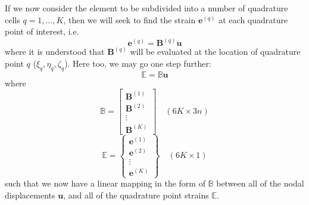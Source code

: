 \documentclass[11pt]{article} %
\begin{document}
If we now consider the element to be subdivided into a number of quadrature cells $q = 1, \ldots, K$, then we will seek to find the strain $\mathbf{e}^{(q)}$ at each quadrature point of interest, i.e.
\begin{equation}
	\mathbf{e}^{(q)} = \mathbf{B}^{(q)} \mathbf{u}
\end{equation}
where it is understood that $\mathbf{B}^{(q)}$ will be evaluated at the location of quadrature point $q$ ($\xi_q, \eta_q, \zeta_q$). Here too, we may go one step further:
\begin{equation}
	\mathbb{E} = \mathbb{B} \mathbf{u}
\end{equation}
where
\begin{equation}
	\mathbb{B} = \left[ \begin{array}{c} \mathbf{B}^{(1)} \\ \mathbf{B}^{(2)} \\ \vdots \\ \mathbf{B}^{(K)} \end{array} \right] \quad (6K \times 3n)
\end{equation}
\begin{equation}
	\mathbb{E} = \left\{ \begin{array}{c} \mathbf{e}^{(1)} \\ \mathbf{e}^{(2)} \\ \vdots \\ \mathbf{e}^{(K)} \end{array} \right\} \quad (6K \times 1)
\end{equation}
such that we now have a linear mapping in the form of $\mathbb{B}$ between all of the nodal displacements $\mathbf{u}$, and all of the quadrature point strains $\mathbb{E}$.
\end{document}
